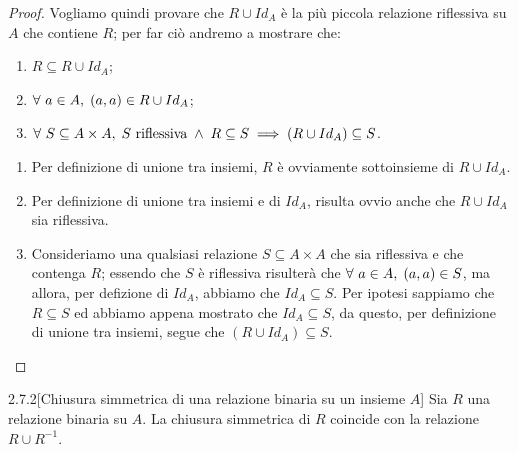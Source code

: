 \begin{proof}
Vogliamo quindi provare che $R \cup Id_A$ è la più piccola relazione riflessiva su $A$ che contiene $R$; per far ciò andremo a mostrare che:
\begin{enumerate}
\item $R \subseteq R \cup Id_A$;
\item $\forall \ a \in A ,\; (a,a) \in R \cup Id_A$;
\item $\forall \ S \subseteq A \times A ,\;
	S \ \text{riflessiva} \; \land \; R \subseteq S
	\implies (R \cup Id_A) \subseteq S$.
\end{enumerate}

\begin{enumerate}[leftmargin=*]
\item Per definizione di unione tra insiemi, $R$ è ovviamente sottoinsieme di $R \cup Id_A$.
\item Per definizione di unione tra insiemi e di $Id_A$, risulta ovvio anche che $R \cup Id_A$ sia riflessiva.
\item Consideriamo una qualsiasi relazione $S \subseteq A \times A$ che sia riflessiva e che contenga $R$; essendo che $S$ è riflessiva risulterà che $\forall \ a \in A ,\; (a,a) \in S$, ma allora, per defizione di $Id_A$, abbiamo che $Id_A \subseteq S$.
Per ipotesi sappiamo che $R \subseteq S$ ed abbiamo appena mostrato che $Id_A \subseteq S$,
da questo, per definizione di unione tra insiemi, segue che $(R \cup Id_A) \subseteq S$.
\end{enumerate}
\end{proof}

\begin{customthm}{2.7.2}[Chiusura simmetrica di una relazione binaria su un insieme $A$]
\label{th:2.7.2}
Sia $R$ una relazione binaria su $A$.
La chiusura simmetrica di $R$ coincide con la relazione $R \cup R^{-1}$.
\end{customthm}

